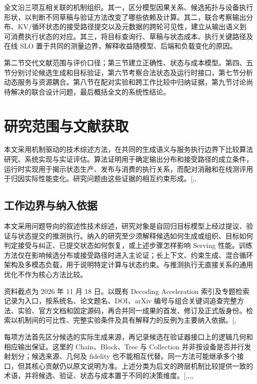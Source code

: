 \documentclass[
  a4paper,
  UTF8,
  fontset=none,
  zihao=5]{ctexart}
\begin{document}
全文沿三项互相关联的机制组织。其一，区分模型因果关系、候选拓扑与设备执行形状，以判断不同草稿与验证方法改变了哪些依赖及计算。其二，联合考察输出分布、KV/循环状态的接受路径提交以及元数据的跨轮可见性，建立从输出语义到可消费执行状态的对应。其三，将目标查询行、草稿与状态成本、执行关键路径及在线
SLO 置于共同的测量边界，解释收益随模型、后端和负载变化的原因。

第二节交代文献范围与评价口径；第三节建立正确性、状态与成本模型。第四、五节分别讨论候选生成和目标验证，第六节考察合法状态及运行时接口，第七节分析动态服务与资源耦合。第八节在配对实验和跨工作比较中归纳证据，第九节讨论尚待解决的联合设计问题，最后概括全文的系统性结论。

\section{研究范围与文献获取}\label{scope}

本文采用机制驱动的技术综述方法，在共同的生成语义与服务执行边界下比较算法研究、系统实现与实证评估。算法证明用于确定输出分布和接受路径的成立条件，运行时实现用于揭示状态生产、发布与消费的执行关系，而配对消融和在线测评用于归因实际性能变化。研究问题由这些证据的相互约束形成。{[},,\citeproc{ref-zhao2026survey}{19}{]}

\subsection{工作边界与纳入依据}\label{selection}

本文采用问题导向的叙述性技术综述，研究对象是自回归目标模型上经过提议、验证与状态提交的推测执行。纳入的研究至少须解释候选如何生成或组织、目标如何判定接受与纠正、已提交状态如何恢复，或上述步骤怎样影响
Serving
性能。训练方法仅在影响候选分布或接受路径时进入主论证；长上下文、约束生成、混合循环架构及多模态负载，用于说明特定计算与状态约束。与推测执行无直接关系的通用优化不作为核心方法比较。

资料截点为 2026 年 11 月 18 日。以既有 Decoding Acceleration
索引及专题检索记录为入口，按系统名、论文题名、DOI、arXiv
编号与组合关键词追查完整方法、实验、官方文档和固定源码，再合并同一成果的首发、修订及正式版身份。检索以机制间的可比性、完整实验条件及具有解释力的反例为主要纳入依据。{[},\citeproc{ref-website-index}{21}{]}

每项方法首先区分候选的实际生成来源，再记录候选在验证器接口上的逻辑几何和相应输出保证。这里的
Chain、Block、Tree 与 Collection
并非按设备是否并行发射划分；候选来源、几何及 fidelity
也不能相互代替。同一方法可能继承多个接口，但其核心贡献仍以原文说明为准。上述分类为后文的跨层机制比较提供一致的术语，并将候选、验证、状态与成本置于不同的决策维度。{[},,,,\citeproc{ref-spectr}{22}{]}
\end{document}
